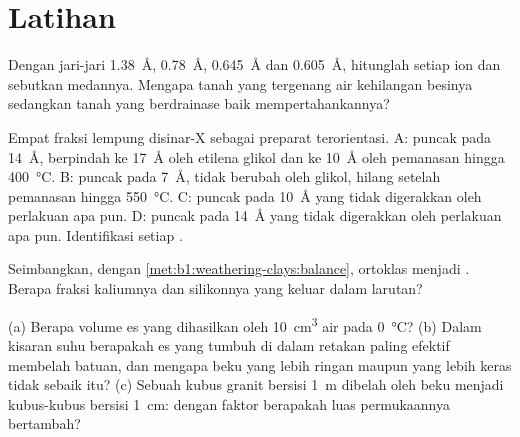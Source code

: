 \section{Latihan}

\begin{exercise}[$\star$]\label{exo:b1:weathering-clays:1}
Dengan jari-jari  \qty{1.38}{\angstrom},  \qty{0.78}{\angstrom},
 \qty{0.645}{\angstrom} dan  \qty{0.605}{\angstrom}, hitunglah
 setiap ion dan sebutkan medannya. Mengapa tanah yang tergenang air kehilangan besinya sedangkan tanah yang berdrainase baik mempertahankannya?
\end{exercise}

\begin{exercise}[$\star$]\label{exo:b1:weathering-clays:2}
Empat fraksi lempung disinar-X sebagai preparat terorientasi. A: puncak pada
\SI{14}{\angstrom}, berpindah ke \SI{17}{\angstrom} oleh etilena glikol dan ke
\SI{10}{\angstrom} oleh pemanasan hingga \SI{400}{\celsius}. B: puncak pada
\SI{7}{\angstrom}, tidak berubah oleh glikol, hilang setelah pemanasan hingga
\SI{550}{\celsius}. C: puncak pada \SI{10}{\angstrom} yang tidak digerakkan oleh perlakuan apa pun. D:
puncak pada \SI{14}{\angstrom} yang tidak digerakkan oleh perlakuan apa pun. Identifikasi setiap .
\end{exercise}

\begin{exercise}[$\star$]\label{exo:b1:weathering-clays:3}
Seimbangkan, dengan \cref{met:b1:weathering-clays:balance},  ortoklas  menjadi . Berapa fraksi kaliumnya dan silikonnya yang keluar dalam larutan?
\end{exercise}

\begin{exercise}[$\star$]\label{exo:b1:weathering-clays:4}
(a) Berapa volume es yang dihasilkan oleh \qty{10}{cm^3} air pada \qty{0}{\celsius}? (b) Dalam kisaran suhu berapakah es yang tumbuh di dalam retakan paling efektif membelah batuan, dan mengapa beku yang lebih ringan maupun yang lebih keras tidak sebaik itu? (c) Sebuah kubus granit bersisi \qty{1}{m} dibelah oleh beku menjadi kubus-kubus bersisi \qty{1}{cm}: dengan faktor berapakah luas permukaannya bertambah?
\end{exercise}


